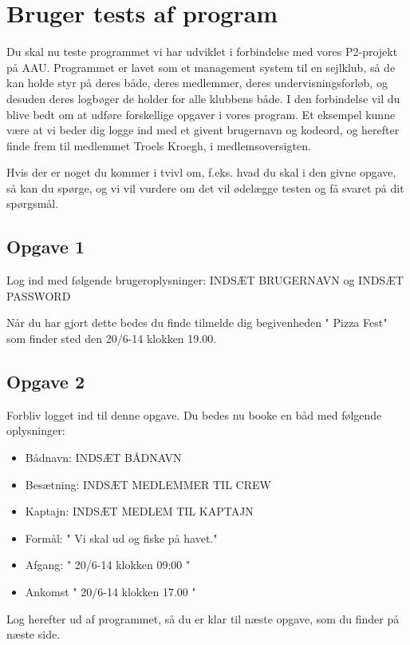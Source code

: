\chapter{Bruger tests af program}\label{BrugerTestCases}
\cbstart
Du skal nu teste programmet vi har udviklet i forbindelse med vores P2-projekt på AAU. Programmet er lavet som et management system til en sejlklub, så de kan holde styr på deres både, deres medlemmer, deres undervisningsforløb, og desuden deres logbøger de holder for alle klubbens både. I den forbindelse vil du blive bedt om at udføre forskellige opgaver i vores program. Et eksempel kunne være at vi beder dig logge ind med et givent brugernavn og kodeord, og herefter finde frem til medlemmet Troels Kroegh, i medlemsoversigten.

Hvis der er noget du kommer i tvivl om, f.eks. hvad du skal i den givne opgave, så kan du spørge, og vi vil vurdere om det vil ødelægge testen og få svaret på dit spørgsmål.


\section{Opgave 1}

Log ind med følgende brugeroplysninger: INDSÆT BRUGERNAVN og INDSÆT PASSWORD

Når du har gjort dette bedes du finde tilmelde dig begivenheden " Pizza Fest" som finder sted den 20/6-14  klokken 19.00.

\section{Opgave 2}

Forbliv logget ind til denne opgave. Du bedes nu booke en båd med følgende oplysninger:

\begin{itemize}
	\item Bådnavn: INDSÆT BÅDNAVN
	\item Besætning: INDSÆT MEDLEMMER TIL CREW
	\item Kaptajn: INDSÆT MEDLEM TIL KAPTAJN
	\item Formål: " Vi skal ud og fiske på havet."
	\item Afgang: " 20/6-14 klokken 09:00 " 
	\item Ankomst " 20/6-14 klokken 17.00 "
\end{itemize}

Log herefter ud af programmet, så du er klar til næste opgave, som du finder på næste side.


